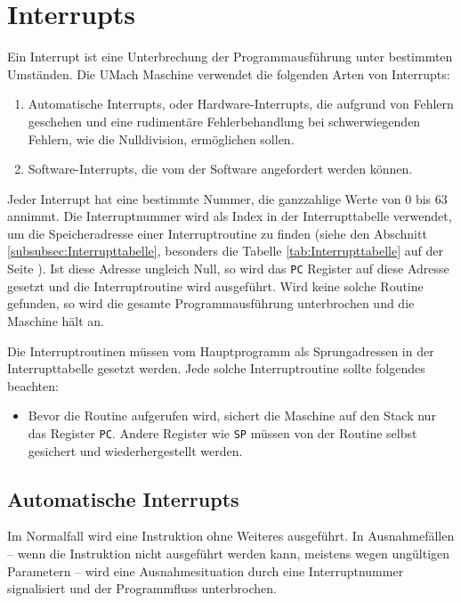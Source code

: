 \section{Interrupts}
\label{sec:Interrupts}

Ein Interrupt ist eine Unterbrechung der Programmausführung unter bestimmten
Umständen. Die UMach Maschine verwendet die folgenden Arten von Interrupts:

\begin{enumerate}
 \item Automatische Interrupts, oder Hardware-Interrupts, die aufgrund von
       Fehlern geschehen und eine rudimentäre Fehlerbehandlung bei
       schwerwiegenden Fehlern, wie die Nulldivision, ermöglichen sollen.
 \item Software-Interrupts, die vom der Software angefordert
       werden können.
\end{enumerate}

Jeder Interrupt hat eine bestimmte Nummer, die ganzzahlige Werte von 0 bis 63
annimmt. Die Interruptnummer wird als Index in der Interrupttabelle
verwendet, um die Speicheradresse einer Interruptroutine zu finden (siehe den
Abschnitt \ref{subsubsec:Interrupttabelle}, besonders die Tabelle
\ref{tab:Interrupttabelle} auf der Seite \pageref{tab:Interrupttabelle}). Ist
diese Adresse ungleich Null, so wird das \texttt{PC} Register auf diese Adresse
gesetzt und die Interruptroutine wird ausgeführt. Wird keine solche Routine
gefunden, so wird die gesamte Programmausführung unterbrochen und die Maschine
hält an.

Die Interruptroutinen müssen vom Hauptprogramm als Sprungadressen in der
Interrupttabelle gesetzt werden. Jede solche Interruptroutine sollte folgendes
beachten:
\begin{itemize}
 \item Bevor die Routine aufgerufen wird, sichert die Maschine auf den Stack
       nur das Register \texttt{PC}. Andere Register wie \texttt{SP} müssen
       von der Routine selbst gesichert und wiederhergestellt werden.
\end{itemize}


\subsection{Automatische Interrupts}

Im Normalfall wird eine Instruktion ohne Weiteres ausgeführt. In Ausnahmefällen
-- wenn die Instruktion nicht ausgeführt werden kann, meistens wegen ungültigen
Parametern -- wird eine Ausnahmesituation durch eine
Interruptnummer signalisiert und der Programmfluss unterbrochen.




